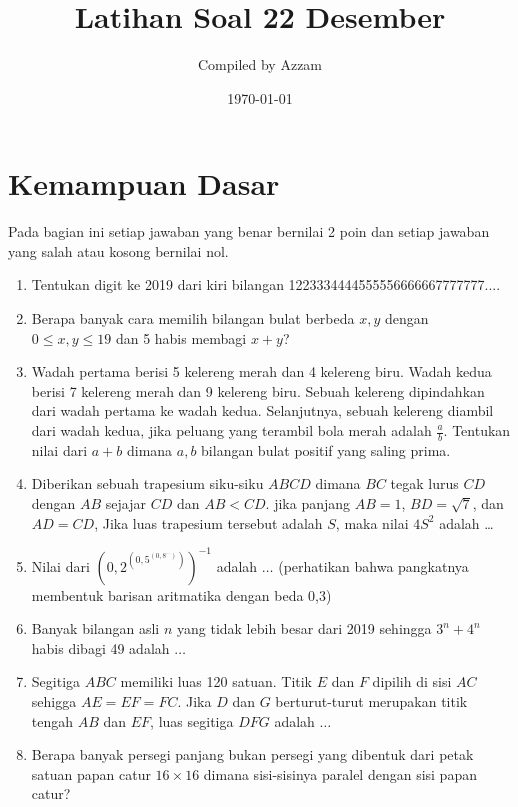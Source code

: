 \documentclass[11pt]{scrartcl}
\begin{document}
	\title{Latihan Soal 22 Desember} %
	\date{\today}
	\author{Compiled by Azzam}
	\maketitle
	\section{Kemampuan Dasar}
	Pada bagian ini setiap jawaban yang benar bernilai 2 poin dan setiap jawaban yang salah
	atau kosong bernilai nol.
	\begin{enumerate}
		\item
		Tentukan digit ke 2019 dari kiri bilangan 1223334444555556666667777777....
		
		\item
		Berapa banyak cara memilih bilangan bulat berbeda $x, y$ dengan $0 \le x, y \le 19$ dan 5 habis membagi $x + y$?
		
		\item
		Wadah pertama berisi 5 kelereng merah dan 4 kelereng biru. Wadah kedua berisi 7 kelereng merah dan
		9 kelereng biru. Sebuah kelereng dipindahkan dari wadah pertama ke wadah kedua. Selanjutnya, sebuah
		kelereng diambil dari wadah kedua, jika peluang yang terambil bola merah adalah
		$\frac{a}{b}$. Tentukan nilai dari $a+b$ dimana $a, b$ bilangan bulat positif yang saling prima.
		
		\item
		Diberikan sebuah trapesium siku-siku $ABCD$ dimana $BC$ tegak lurus $CD$ dengan $AB$ sejajar $CD$ dan $AB < CD$. jika panjang $AB = 1$, $BD = \sqrt{7}$, dan $AD = CD$, Jika luas trapesium tersebut adalah $S$, maka nilai $4S^2$ adalah \dots
		
		\item Nilai dari $\left(0,2 ^{\left(0,5 ^{\left(0,8 ^{...} \right)} \right)} \right)^{-1}$ adalah $\dots$ (perhatikan bahwa pangkatnya membentuk barisan aritmatika dengan beda 0,3)
		
		\item Banyak bilangan asli $n$ yang tidak lebih besar dari 2019 sehingga $3^n+4^n$ habis dibagi 49 adalah $\dots$
		
		\item Segitiga $ABC$ memiliki luas 120 satuan. Titik $E$ dan $F$ dipilih di sisi $AC$ sehigga $AE=EF=FC$. Jika $D$ dan $G$ berturut-turut merupakan titik tengah $AB$ dan $EF$, luas segitiga $DFG$ adalah $\dots$
		
		\item
		Berapa banyak persegi panjang bukan persegi yang dibentuk dari petak satuan papan catur $16 \times 16$ dimana sisi-sisinya paralel dengan sisi papan catur?
		
	\end{enumerate}
\end{document}
